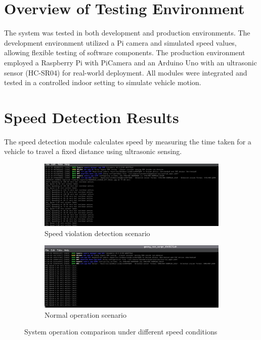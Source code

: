 
\section{Overview of Testing Environment}
The system was tested in both development and production environments. The development environment utilized a Pi camera and simulated speed values, allowing flexible testing of software components. The production environment employed a Raspberry Pi with PiCamera and an Arduino Uno with an ultrasonic sensor (HC-SR04) for real-world deployment. All modules were integrated and tested in a controlled indoor setting to simulate vehicle motion.

\section{Speed Detection Results}
The speed detection module calculates speed by measuring the time taken for a vehicle to travel a fixed distance using ultrasonic sensing. 

\begin{figure}[!htbp]
\centering
\begin{subfigure}[b]{0.48\textwidth}
\centering
\includegraphics[width=\textwidth]{figures/photo_2025-05-27_01-24-17.jpg}
\caption{Speed violation detection scenario}
\label{fig:violation}
\end{subfigure}
\hfill
\begin{subfigure}[b]{0.48\textwidth}
\centering
\includegraphics[width=\textwidth]{figures/photo_2025-05-27_01-24-10.jpg}
\caption{Normal operation scenario}
\label{fig:normal}
\end{subfigure}
\caption{System operation comparison under different speed conditions}
\label{fig:scenarios}
\end{figure}

